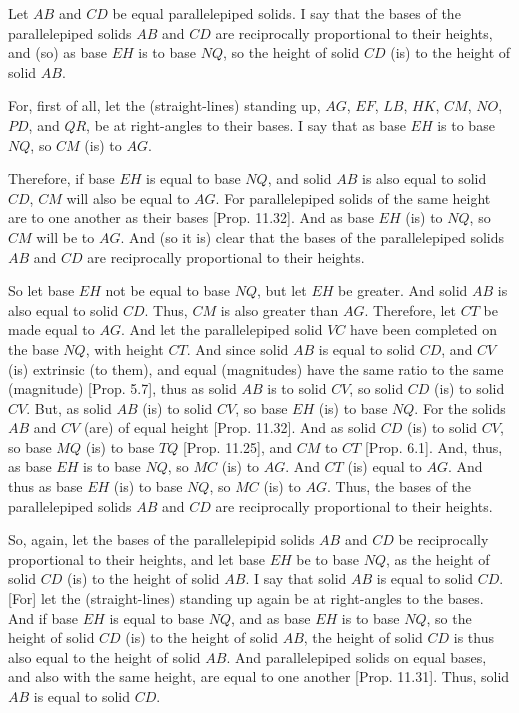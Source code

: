 \begin{Parallel}{}{}
{Let $AB$ and $CD$ be equal parallelepiped solids. I say that the
bases of the parallelepiped solids $AB$ and $CD$ are reciprocally
proportional to their heights, and (so) as base $EH$ is to base $NQ$, so the
height of solid $CD$ (is) to the height of solid $AB$.

For, first of all, let the (straight-lines) standing up, $AG$, $EF$, $LB$, $HK$, $CM$,
$NO$, $PD$, and $QR$,  be at right-angles to their bases. I say that
as base $EH$ is to base $NQ$, so $CM$ (is) to $AG$.

Therefore, if base $EH$ is equal to base $NQ$, and solid $AB$ is also
equal to solid $CD$, $CM$ will also be equal to $AG$. For
parallelepiped solids of the same height are to one another as their bases [Prop. 11.32]. And as base $EH$ (is) to $NQ$,
so $CM$ will be to $AG$. And (so it is) clear that the bases of the parallelepiped
solids $AB$ and $CD$ are reciprocally proportional to their heights.

\epsfysize=1.9in
\centerline{}

So let base $EH$ not be equal to base $NQ$, but let $EH$ be greater. And
solid $AB$ is also equal to solid $CD$. Thus, $CM$ is also greater than $AG$.  Therefore, let $CT$ be made equal to $AG$. And let the parallelepiped
solid $VC$ have been completed on the base $NQ$, with height $CT$.
And since solid $AB$ is equal to solid $CD$, and $CV$ (is)
extrinsic (to them), and equal (magnitudes) have the same ratio to the
same (magnitude) [Prop. 5.7], thus as solid
$AB$ is to solid $CV$, so solid $CD$ (is) to solid $CV$. But, as
solid $AB$ (is) to solid $CV$, so base $EH$ (is) to base $NQ$. For the solids $AB$ and $CV$ (are) of equal
height [Prop. 11.32]. And as solid $CD$ (is) to solid $CV$, so base $MQ$ (is) to 
base $TQ$ [Prop. 11.25], and $CM$ to $CT$
[Prop. 6.1].
And, thus, as base $EH$ is to base $NQ$, so $MC$ (is) to $AG$.
And $CT$ (is) equal to $AG$. And
thus as base $EH$ (is) to base $NQ$, so $MC$ (is) to $AG$. Thus, the
bases of the parallelepiped solids $AB$ and $CD$ are reciprocally proportional to their
heights.

So, again, let the bases of the parallelepipid solids $AB$ and $CD$
be reciprocally proportional to their heights, and let base $EH$
be to base $NQ$, as the height of solid $CD$ (is) to the
height of solid $AB$. I say that solid $AB$ is equal to solid $CD$.
\mbox{[}For] let the (straight-lines) standing up again be at right-angles to the
bases. And if base $EH$ is equal to base $NQ$, and as base $EH$
is to base $NQ$, so the height of solid $CD$ (is) to the
height of solid $AB$, the height of solid $CD$ is thus also
equal to the height of solid $AB$. And parallelepiped solids on equal
bases, and also with the same height,  are equal to one another [Prop. 11.31]. Thus, solid $AB$ is equal to solid $CD$.

}
\end{Parallel}
